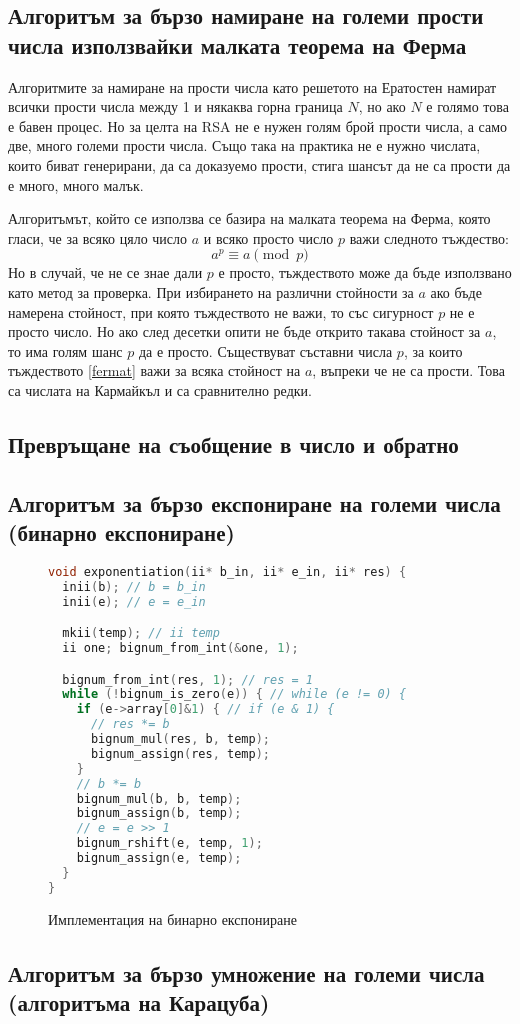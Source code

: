   \subsection{Алгоритъм за бързо намиране на големи прости числа използвайки малката теорема на Ферма} \label{primesalgo}
  Алгоритмите за намиране на прости числа като решетото на Ератостен\cite{primesieve} намират всички прости числа между 1 и някаква горна граница $N$, но ако $N$ е голямо това е бавен процес. Но за целта на RSA не е нужен голям брой прости числа, а само две, много големи прости числа. Също така на практика не е нужно числата, които биват генерирани, да са доказуемо прости, стига шансът да не са прости да е много, много малък.

  Алгоритъмът, който се използва се базира на малката теорема на Ферма, която гласи, че за всяко цяло число $a$ и всяко просто число $p$ важи следното тъждество:
  \begin{equation}
    a^p \equiv a \pmod{p}
    \label{fermat}
  \end{equation}
  Но в случай, че не се знае дали $p$ е просто, тъждеството може да бъде използвано като метод за проверка. При избирането на различни стойности за $a$ ако бъде намерена стойност, при която тъждеството не важи, то със сигурност $p$ не е просто число. Но ако след десетки опити не бъде открито такава стойност за $a$, то има голям шанс $p$ да е просто.
  Съществуват съставни числа $p$, за които тъждеството \ref{fermat} важи за всяка стойност на $a$, въпреки че не са прости. Това са числата на Кармайкъл и са сравнително редки.\cite{carmichaelrare} %

  \subsection{Превръщане на съобщение в число и обратно} \label{paddingscheme}

  \subsection{Алгоритъм за бързо експониране на големи числа (бинарно експониране)} \label{binexp}

\begin{figure}[p]
\caption{Имплементация на бинарно експониране}
\begin{lstlisting}[language=C]
void exponentiation(ii* b_in, ii* e_in, ii* res) {
  inii(b); // b = b_in
  inii(e); // e = e_in

  mkii(temp); // ii temp
  ii one; bignum_from_int(&one, 1);

  bignum_from_int(res, 1); // res = 1
  while (!bignum_is_zero(e)) { // while (e != 0) {
    if (e->array[0]&1) { // if (e & 1) {
      // res *= b
      bignum_mul(res, b, temp);
      bignum_assign(res, temp);
    }
    // b *= b
    bignum_mul(b, b, temp);
    bignum_assign(b, temp);
    // e = e >> 1
    bignum_rshift(e, temp, 1);
    bignum_assign(e, temp);
  }
}
\end{lstlisting}
\end{figure}

  \subsection{Алгоритъм за бързо умножение на големи числа (алгоритъма на Карацуба)} \label{karatsuba}

